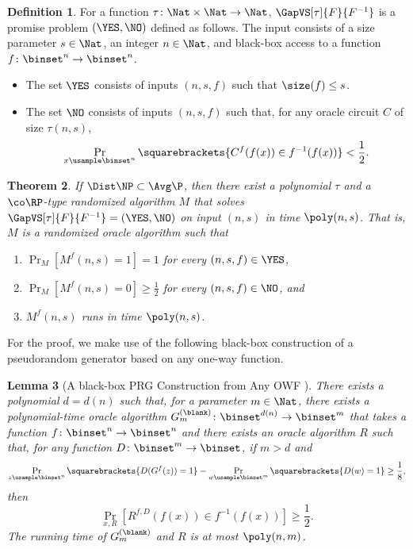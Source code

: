 \documentclass[11pt]{article}
\numberwithin{equation}{section}
\newtheorem{theorem}{Theorem}[section]
\newtheorem{lemma}[theorem]{Lemma}
\theoremstyle{definition}
\newtheorem{definition}[theorem]{Definition}
\theoremstyle{plain}
\begin{document}
\begin{definition}
  For a function $\tau \colon \Nat \times \Nat \to \Nat$,
  $\GapVS[\tau]{F}{F^{-1}}$
  is a promise problem $(\YES, \NO)$ defined as follows.
  The input consists of a size parameter $s \in \Nat$, an integer $n \in \Nat$,
  and black-box access to a function $f \colon \binset^n \to \binset^n$.
  \begin{itemize}
    \item
          The set $\YES$ consists of inputs $(n, s, f)$
          such that $\size(f) \le s$.
    \item
          The set $\NO$ consists of
          inputs $(n, s, f)$
          such that, for any oracle circuit $C$ of size $\tau(n, s)$,
          $$
            \Pr_{x \usample \binset^n} \squarebrackets{ C^f(f(x)) \in f^{-1}(f(x)) } < \frac{1}{2}.
          $$
  \end{itemize}
\end{definition}

\begin{theorem}
  \label{thm_FvsFinv}
  If $\Dist\NP \subset \Avg\P$,
  then there exist
  a polynomial $\tau$ and
  a $\co\RP$-type randomized algorithm $M$ that solves $\GapVS[\tau]{F}{F^{-1}} = (\YES, \NO)$
  on input $(n, s)$
  in time $\poly(n, s)$.
  That is, $M$ is a randomized oracle algorithm such that
  \begin{enumerate}
    \item
          $\Pr_M [ M^f(n, s) = 1 ] = 1$ for every $(n, s, f) \in \YES$,
    \item
          $\Pr_M [ M^f(n, s) = 0 ] \ge \frac{1}{2}$ for every $(n, s, f) \in \NO$, and
    \item
          $M^f(n, s)$ runs in time $\poly(n, s)$.
  \end{enumerate}
\end{theorem}

For the proof, we make use of the following black-box construction
of a pseudorandom generator based on any one-way function.
\begin{lemma}
  [A black-box PRG Construction from Any OWF \cite{HastadILL99_siamcomp_journals}]
  \label{lemma_BBPRGfromOWF}
  There exists a polynomial $d = d(n)$
  such that,
  for a parameter $m \in \Nat$,
  there exists a polynomial-time oracle algorithm $G_{m}^{(\blank)} \colon \binset^{d(n)} \to \binset^{m}$
  that takes a function $f \colon \binset^n \to \binset^n$
  and there exists an oracle algorithm $R$
  such that, for any function $D \colon \binset^m \to \binset$, if $m > d$ and
  $$
    \Pr_{z \usample \binset^n} \squarebrackets{ D(G^f(z)) = 1 }
    -
    \Pr_{w \usample \binset^m} \squarebrackets{ D(w) = 1 }
    \ge
    \frac{1}{8},
  $$
  then
  $$
    \Pr_{x, R} [R^{f, D}(f(x)) \in f^{-1}(f(x))] \ge \frac{1}{2}.
  $$
  The running time of $G_{m}^{(\blank)}$ and $R$ is at most $\poly(n, m)$.
\end{lemma}
\end{document}
